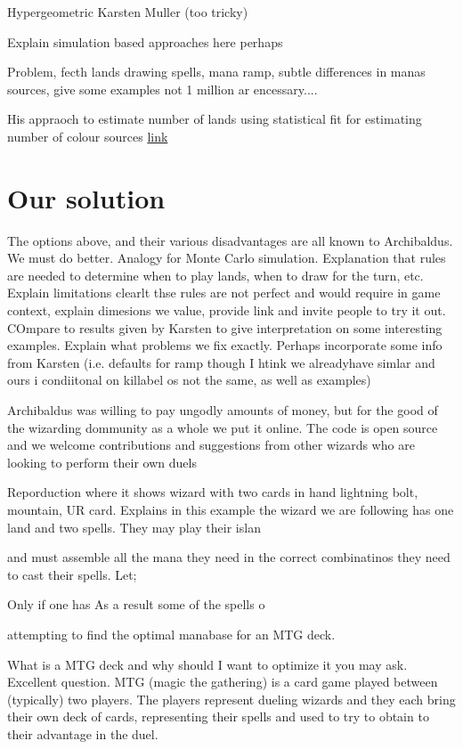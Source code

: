 \documentclass[
    a4paper,
    DIV=13,
    abstract=true,
    numbers=noenddot
]{scrartcl}
\begin{document}
Hypergeometric Karsten Muller (too tricky)

Explain simulation based approaches here perhaps

Problem, fecth lands drawing spells, mana ramp, subtle differences in manas sources, give some examples not 1 million ar encessary....


His appraoch to estimate number of lands using statistical fit for estimating number of colour sources
 \href{https://www.tcgplayer.com/content/article/how-many-lands-do-you-need-in-your-deck-an-updated-analysis/cd1c1a24-d439-4a8e-b369-b936edb0b38a/}{link}
\section{Our solution}
The options above, and their various disadvantages are all known to Archibaldus. We must do better. Analogy for Monte Carlo simulation. Explanation that rules are needed to determine when to play lands, when to draw for the turn, etc. Explain limitations clearlt thse rules are not perfect and would require in game context, explain dimesions we value, provide link and invite people to try it out. COmpare to results given by Karsten to give interpretation on some interesting examples. Explain what problems we fix exactly. Perhaps incorporate some info from Karsten (i.e. defaults for ramp though I htink we alreadyhave simlar and ours i condiitonal on killabel os not the same, as well as examples)


Archibaldus was willing to pay ungodly amounts of money, but for the good of the wizarding dommunity as a whole we put it online. The code is open source and we welcome contributions and suggestions from other wizards who are looking to perform their own duels





Reporduction where it shows wizard with two cards in hand lightning bolt, mountain, UR card. Explains in this example the wizard we are following has one land and two spells. They may play their islan



and must assemble all the mana they need in the correct combinatinos they need to cast their spells. Let;

Only if one has As a result some of the spells o

attempting to find the optimal manabase for an MTG deck.

What is a MTG deck and why should I want to optimize it you may ask. Excellent question. MTG (magic the gathering) is a card game played between (typically) two players. The players represent dueling wizards and they each bring their own deck of cards, representing their spells and used to try to obtain to their advantage in the duel.
\end{document}
